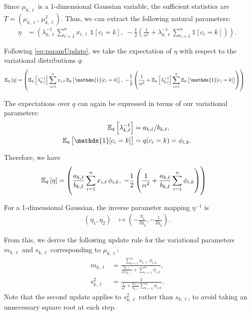 \documentclass[11pt]{article}
\begin{document}
Since $\mu_{k,\ell}$ is a 1-dimensional Gaussian variable, the sufficient statistics are $T = (\mu_{k,\ell}, \, \mu_{k,\ell}^2)$.
Thus, we can extract the following natural parameters:
\begin{align}
\eta &= \left(
    \lambda_{k,\ell}^{-1} \sum_{i=1}^n x_{i,\ell} \, \mathds{1}[c_i=k], \;
    -\frac{1}{2} \left( \frac{1}{\alpha^2} + \lambda_{k,\ell}^{-1} \sum_{i=1}^n \mathds{1}[c_i=k] \right)
\right).
\end{align}

Following \eqref{eq:paramUpdate}, we take the expectation of $\eta$ with respect to the variational distributions $q$:
\begin{align}
\expectOver{q}{\eta}
&=
\left(
    \expectOver{q}{\lambda_{k,\ell}^{-1}} \sum_{i=1}^n x_{i,\ell} \, \expectOver{q}{\mathds{1}[c_i=k]}, \;
    -\frac{1}{2} \left( \frac{1}{\alpha^2} + \expectOver{q}{\lambda_{k,\ell}^{-1}} \sum_{i=1}^n \expectOver{q}{\mathds{1}[c_i=k]} \right)
\right)
\end{align}

The expectations over $q$ can again be expressed in terms of our variational parameters:
\begin{align}
\expectOver{q}{\lambda_{k,\ell}^{-1}} &= a_{k,\ell} / b_{k,\ell}, \\
\expectOver{q}{\mathds{1}[c_i=k]} &= q(c_i = k) = \phi_{i,k}.
\end{align}

Therefore, we have
\begin{align}
\mathbb{E}_{\substack{q}}\left[ \eta \right]
&=
\left(
    \frac{a_{k,\ell}}{b_{k,\ell}} \sum_{i=1}^n x_{i,\ell} \, \phi_{i,k}, \;
    -\frac{1}{2} \left( \frac{1}{\alpha^2} + \frac{a_{k,\ell}}{b_{k,\ell}} \sum_{i=1}^n \phi_{i,k} \right)
\right)
\end{align}

For a 1-dimensional Gaussian, the inverse parameter mapping $\eta^{-1}$ is
\begin{align}
(\eta_1, \eta_2)
&\mapsto
\left( -\frac{\eta_1}{2 \eta_2}, -\frac{1}{2 \eta_2} \right).
\end{align}

From this, we derive the following update rule for the variational parameters $m_{k,\ell}$ and $s_{k,\ell}$ corresponding to $\mu_{k,\ell}$:
\begin{align}
\label{eq:exVarUpdateM}
m_{k,\ell} &= \frac{ \sum_{i=1}^n x_{i,\ell} \, \phi_{i,k} }
                   { \frac{b_{k,\ell}}{\alpha^2 a_{k,\ell}} + \sum_{i=1}^n \phi_{i,k} }, \\
\label{eq:exVarUpdateS}
s_{k,\ell}^2 &= \frac{ 1 }
                   { \frac{1}{\alpha^2} + \frac{a_{k,\ell}}{b_{k,\ell}} \sum_{i=1}^n \phi_{i,k} }.
\end{align}
Note that the second update applies to $s_{k,\ell}^2$ rather than $s_{k,\ell}$, to avoid taking an unnecessary square root at each step.
\end{document}
